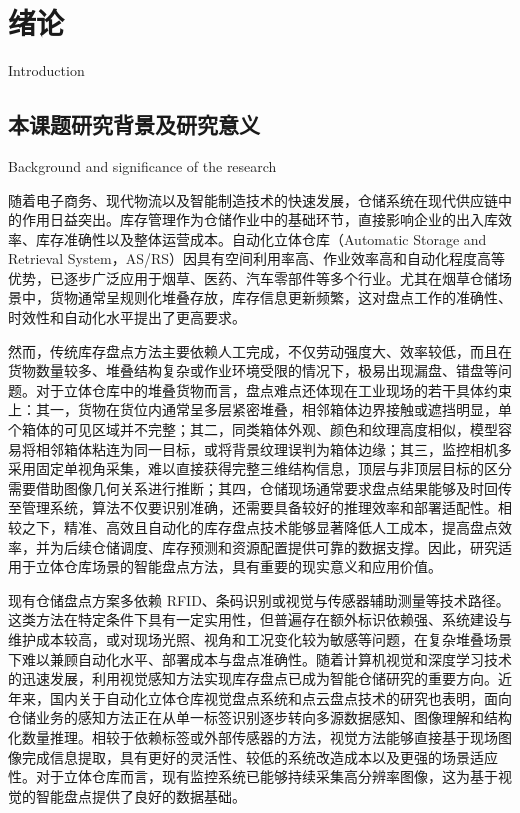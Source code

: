 ﻿\chapter{绪论}{Introduction}

\section{本课题研究背景及研究意义}{
  Background and significance of the research
}

随着电子商务、现代物流以及智能制造技术的快速发展，仓储系统在现代供应链中的作用日益突出。库存管理作为仓储作业中的基础环节，直接影响企业的出入库效率、库存准确性以及整体运营成本。自动化立体仓库（Automatic Storage and Retrieval System，AS/RS）因具有空间利用率高、作业效率高和自动化程度高等优势，已逐步广泛应用于烟草、医药、汽车零部件等多个行业\cite{low2024asrs,tubis2023intelligentwarehouse}。尤其在烟草仓储场景中，货物通常呈规则化堆叠存放，库存信息更新频繁，这对盘点工作的准确性、时效性和自动化水平提出了更高要求。

然而，传统库存盘点方法主要依赖人工完成，不仅劳动强度大、效率较低，而且在货物数量较多、堆叠结构复杂或作业环境受限的情况下，极易出现漏盘、错盘等问题。对于立体仓库中的堆叠货物而言，盘点难点还体现在工业现场的若干具体约束上：其一，货物在货位内通常呈多层紧密堆叠，相邻箱体边界接触或遮挡明显，单个箱体的可见区域并不完整；其二，同类箱体外观、颜色和纹理高度相似，模型容易将相邻箱体粘连为同一目标，或将背景纹理误判为箱体边缘；其三，监控相机多采用固定单视角采集，难以直接获得完整三维结构信息，顶层与非顶层目标的区分需要借助图像几何关系进行推断；其四，仓储现场通常要求盘点结果能够及时回传至管理系统，算法不仅要识别准确，还需要具备较好的推理效率和部署适配性。相较之下，精准、高效且自动化的库存盘点技术能够显著降低人工成本，提高盘点效率，并为后续仓储调度、库存预测和资源配置提供可靠的数据支撑。因此，研究适用于立体仓库场景的智能盘点方法，具有重要的现实意义和应用价值。

现有仓储盘点方案多依赖 RFID、条码识别或视觉与传感器辅助测量等技术路径\cite{wang2010rfidtobacco,liu2013cigarettewms,vis2006agv,xu2018dronebarcode,radacsi2022droneinventory,yang2025pointcloudinventory}。这类方法在特定条件下具有一定实用性，但普遍存在额外标识依赖强、系统建设与维护成本较高，或对现场光照、视角和工况变化较为敏感等问题，在复杂堆叠场景下难以兼顾自动化水平、部署成本与盘点准确性。随着计算机视觉和深度学习技术的迅速发展，利用视觉感知方法实现库存盘点已成为智能仓储研究的重要方向\cite{zhao2022rgbdwarehouse,xu2018dronebarcode,li2026warehousevisualinventory,daios2024warehousecvrequirements,tadjine2025warehousecvsurvey}。近年来，国内关于自动化立体仓库视觉盘点系统和点云盘点技术的研究也表明，面向仓储业务的感知方法正在从单一标签识别逐步转向多源数据感知、图像理解和结构化数量推理\cite{li2026warehousevisualinventory,yang2025pointcloudinventory}。相较于依赖标签或外部传感器的方法，视觉方法能够直接基于现场图像完成信息提取，具有更好的灵活性、较低的系统改造成本以及更强的场景适应性。对于立体仓库而言，现有监控系统已能够持续采集高分辨率图像，这为基于视觉的智能盘点提供了良好的数据基础。

